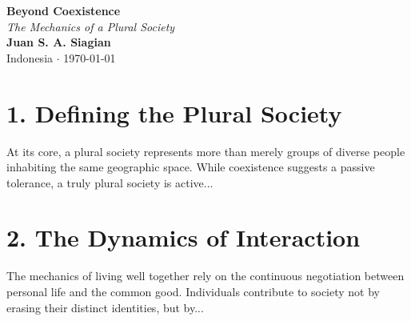\documentclass[11pt,a4paper]{article}
\begin{document}
\begin{center}
    \vspace*{2em}
    {\Huge \textbf{Beyond Coexistence}}\\[0.5em]
    {\Large \textit{The Mechanics of a Plural Society}}\\[2em]

    {\large \textbf{Juan S. A. Siagian}}\\[0.5em]
    {\normalsize Indonesia \hspace{0.5em} $\cdot$ \hspace{0.5em} \today}\\[3em]
\end{center}

\section*{1. Defining the Plural Society}
At its core, a plural society represents more than merely groups of diverse people inhabiting the same geographic space. While coexistence suggests a passive tolerance, a truly plural society is active...

\vspace{1em}

\section*{2. The Dynamics of Interaction}
The mechanics of living well together rely on the continuous negotiation between personal life and the common good. Individuals contribute to society not by erasing their distinct identities, but by...
\end{document}
